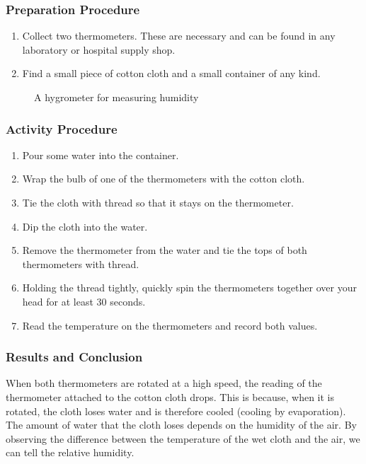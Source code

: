 \subsubsection*{Preparation Procedure}
\begin{enumerate}
\item{Collect two thermometers.  These are necessary and can be found in any laboratory or hospital supply shop.}
\item{Find a small piece of cotton cloth and a small container of any kind.}
\end{enumerate}

\begin{figure}
\begin{center}
\def\svgwidth{2cm}

\caption{A hygrometer for measuring humidity}
\label{fig:hygrometer}
\end{center}
\end{figure}

\subsubsection*{Activity Procedure}
\begin{enumerate}
\item{Pour some water into the container.}
\item{Wrap the bulb of one of the thermometers with the cotton cloth.}
\item{Tie the cloth with thread so that it stays on the thermometer.}
\item{Dip the cloth into the water.}
\item{Remove the thermometer from the water and tie the tops of both thermometers with thread.}
\item{Holding the thread tightly, quickly spin the thermometers together over your head for at least 30 seconds.}
\item{Read the temperature on the thermometers and record both values.}
\end{enumerate}

\subsubsection*{Results and Conclusion}
When both thermometers are rotated at a high speed, the reading of the thermometer attached to the cotton cloth drops.  This is because, when it is rotated, the cloth loses water and is therefore cooled (cooling by evaporation).  The amount of water that the cloth loses depends on the humidity of the air.  By observing the difference between the temperature of the wet cloth and the air, we can tell the relative humidity.

